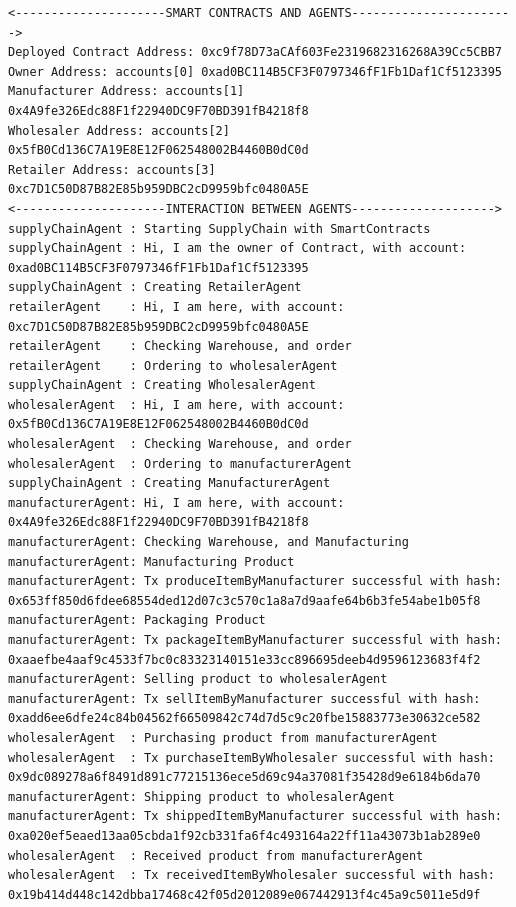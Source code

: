 \vspace{.5cm}

\begin{lstlisting}[numbers=none, basicstyle=\ttfamily\tiny]
<---------------------SMART CONTRACTS AND AGENTS----------------------->
Deployed Contract Address: 0xc9f78D73aCAf603Fe2319682316268A39Cc5CBB7
Owner Address: accounts[0] 0xad0BC114B5CF3F0797346fF1Fb1Daf1Cf5123395
Manufacturer Address: accounts[1] 0x4A9fe326Edc88F1f22940DC9F70BD391fB4218f8
Wholesaler Address: accounts[2] 0x5fB0Cd136C7A19E8E12F062548002B4460B0dC0d
Retailer Address: accounts[3] 0xc7D1C50D87B82E85b959DBC2cD9959bfc0480A5E
<---------------------INTERACTION BETWEEN AGENTS-------------------->
supplyChainAgent : Starting SupplyChain with SmartContracts
supplyChainAgent : Hi, I am the owner of Contract, with account: 0xad0BC114B5CF3F0797346fF1Fb1Daf1Cf5123395
supplyChainAgent : Creating RetailerAgent
retailerAgent    : Hi, I am here, with account: 0xc7D1C50D87B82E85b959DBC2cD9959bfc0480A5E
retailerAgent    : Checking Warehouse, and order
retailerAgent    : Ordering to wholesalerAgent
supplyChainAgent : Creating WholesalerAgent
wholesalerAgent  : Hi, I am here, with account: 0x5fB0Cd136C7A19E8E12F062548002B4460B0dC0d
wholesalerAgent  : Checking Warehouse, and order
wholesalerAgent  : Ordering to manufacturerAgent
supplyChainAgent : Creating ManufacturerAgent
manufacturerAgent: Hi, I am here, with account: 0x4A9fe326Edc88F1f22940DC9F70BD391fB4218f8
manufacturerAgent: Checking Warehouse, and Manufacturing
manufacturerAgent: Manufacturing Product
manufacturerAgent: Tx produceItemByManufacturer successful with hash: 0x653ff850d6fdee68554ded12d07c3c570c1a8a7d9aafe64b6b3fe54abe1b05f8
manufacturerAgent: Packaging Product
manufacturerAgent: Tx packageItemByManufacturer successful with hash: 0xaaefbe4aaf9c4533f7bc0c83323140151e33cc896695deeb4d9596123683f4f2
manufacturerAgent: Selling product to wholesalerAgent
manufacturerAgent: Tx sellItemByManufacturer successful with hash: 0xadd6ee6dfe24c84b04562f66509842c74d7d5c9c20fbe15883773e30632ce582
wholesalerAgent  : Purchasing product from manufacturerAgent
wholesalerAgent  : Tx purchaseItemByWholesaler successful with hash: 0x9dc089278a6f8491d891c77215136ece5d69c94a37081f35428d9e6184b6da70
manufacturerAgent: Shipping product to wholesalerAgent
manufacturerAgent: Tx shippedItemByManufacturer successful with hash: 0xa020ef5eaed13aa05cbda1f92cb331fa6f4c493164a22ff11a43073b1ab289e0
wholesalerAgent  : Received product from manufacturerAgent
wholesalerAgent  : Tx receivedItemByWholesaler successful with hash: 0x19b414d448c142dbba17468c42f05d2012089e067442913f4c45a9c5011e5d9f

\end{lstlisting}
